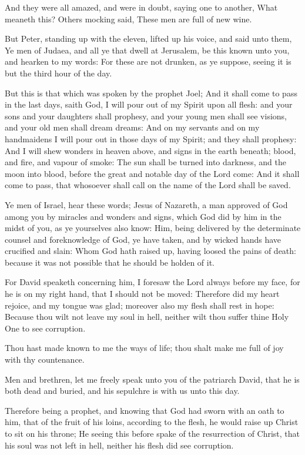 \Verse And they were all amazed, and were in doubt, saying one to another, What meaneth this?  \Verse Others mocking said, These men are full of new wine.

\Verse But Peter, standing up with the eleven, lifted up his voice, and said unto them, Ye men of Judaea, and all ye that dwell at Jerusalem, be this known unto you, and hearken to my words: \Verse For these are not drunken, as ye suppose, seeing it is but the third hour of the day.

\Verse But this is that which was spoken by the prophet Joel; \Verse And it shall come to pass in the last days, saith God, I will pour out of my Spirit upon all flesh: and your sons and your daughters shall prophesy, and your young men shall see visions, and your old men shall dream dreams: \Verse And on my servants and on my handmaidens I will pour out in those days of my Spirit; and they shall prophesy: \Verse And I will shew wonders in heaven above, and signs in the earth beneath; blood, and fire, and vapour of smoke: \Verse The sun shall be turned into darkness, and the moon into blood, before the great and notable day of the Lord come: \Verse And it shall come to pass, that whosoever shall call on the name of the Lord shall be saved.

\Verse Ye men of Israel, hear these words; Jesus of Nazareth, a man approved of God among you by miracles and wonders and signs, which God did by him in the midst of you, as ye yourselves also know: \Verse Him, being delivered by the determinate counsel and foreknowledge of God, ye have taken, and by wicked hands have crucified and slain: \Verse Whom God hath raised up, having loosed the pains of death: because it was not possible that he should be holden of it.

\Verse For David speaketh concerning him, I foresaw the Lord always before my face, for he is on my right hand, that I should not be moved: \Verse Therefore did my heart rejoice, and my tongue was glad; moreover also my flesh shall rest in hope: \Verse Because thou wilt not leave my soul in hell, neither wilt thou suffer thine Holy One to see corruption.

\Verse Thou hast made known to me the ways of life; thou shalt make me full of joy with thy countenance.

\Verse Men and brethren, let me freely speak unto you of the patriarch David, that he is both dead and buried, and his sepulchre is with us unto this day.

\Verse Therefore being a prophet, and knowing that God had sworn with an oath to him, that of the fruit of his loins, according to the flesh, he would raise up Christ to sit on his throne; \Verse He seeing this before spake of the resurrection of Christ, that his soul was not left in hell, neither his flesh did see corruption.


